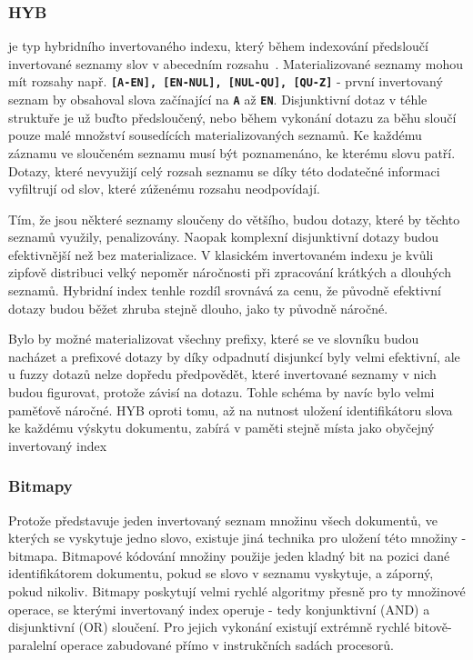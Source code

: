 \documentclass[11pt,letterpaper,oneside,openright]{book}
\newcommand{\bftt}[1]{\texttt{\textbf{#1}}}
\begin{document}
\subsubsection{HYB} \label{sec:hyb} je typ hybridního invertovaného indexu,
který během indexování předsloučí invertované seznamy slov v abecedním
rozsahu~\cite{Bast:2006:TLF:1148170.1148234}.  Materializované seznamy mohou
mít rozsahy např. \bftt{[A-EN], [EN-NUL], [NUL-QU], [QU-Z]} - první invertovaný
seznam by obsahoval slova začínající na \bftt{A} až \bftt{EN}. Disjunktivní
dotaz v téhle struktuře je už buďto předsloučený, nebo během vykonání dotazu za
běhu sloučí pouze malé množství sousedících materializovaných seznamů. Ke
každému záznamu ve sloučeném seznamu musí být poznamenáno, ke kterému slovu
patří. Dotazy, které nevyužijí celý rozsah seznamu se díky této dodatečné
informaci vyfiltrují od slov, které zúženému rozsahu neodpovídají.

Tím, že jsou některé seznamy sloučeny do většího, budou dotazy, které by těchto
seznamů využily, penalizovány. Naopak komplexní disjunktivní dotazy budou
efektivnější než bez materializace. V klasickém invertovaném indexu je kvůli
zipfově distribuci velký nepoměr náročnosti při zpracování krátkých a dlouhých
seznamů. Hybridní index tenhle rozdíl srovnává za cenu, že původně efektivní
dotazy budou běžet zhruba stejně dlouho, jako ty původně náročné.

Bylo by možné materializovat všechny prefixy, které se ve slovníku budou
nacházet a prefixové dotazy by díky odpadnutí disjunkcí byly velmi efektivní,
ale u fuzzy dotazů nelze dopředu předpovědět, které invertované seznamy v nich
budou figurovat, protože závisí na dotazu. Tohle schéma by navíc bylo velmi
paměťově náročné. HYB oproti tomu, až na nutnost uložení identifikátoru slova
ke každému výskytu dokumentu, zabírá v paměti stejně místa jako obyčejný
invertovaný index

\subsubsection{Bitmapy}
Protože představuje jeden invertovaný seznam množinu všech dokumentů, ve
kterých se vyskytuje jedno slovo, existuje jiná technika pro uložení této
množiny - bitmapa. Bitmapové kódování množiny použije jeden kladný bit na
pozici dané identifikátorem dokumentu, pokud se slovo v seznamu vyskytuje, a
záporný, pokud nikoliv. Bitmapy poskytují velmi rychlé algoritmy přesně pro ty
množinové operace, se kterými invertovaný index operuje - tedy konjunktivní
(AND) a disjunktivní (OR) sloučení. Pro jejich vykonání existují extrémně
rychlé bitově-paralelní operace zabudované přímo v instrukčních sadách
procesorů.
\end{document}

